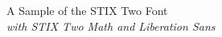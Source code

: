 \documentclass[11pt]{article}
\begin{document}
{\LARGE \noindent A Sample of the STIX Two Font}\\

{\large \noindent \textit{with STIX Two Math and Liberation Sans}}\\[5pt]


\end{document}
